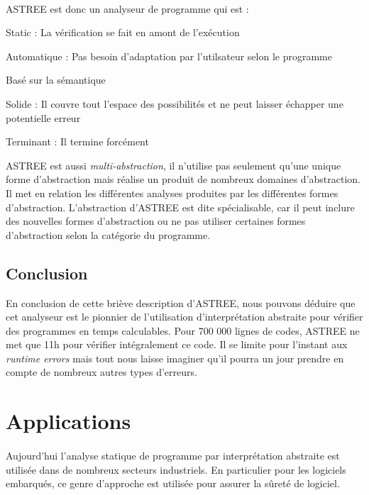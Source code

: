\documentclass[french]{report}
\begin{document}
\paragraph{}
ASTREE est donc un analyseur de programme qui est :
\begin{description}
    \item Static : La vérification se fait en amont de l'exécution
    \item Automatique : Pas besoin d'adaptation par l'utilsateur selon le programme
    \item Basé sur la sémantique
    \item Solide : Il couvre tout l'espace des possibilités et ne peut laisser échapper une potentielle erreur
    \item Terminant : Il termine forcément
\end{description}
ASTREE est aussi \textit{multi-abstraction}, il n'utilise pas seulement qu'une unique forme d'abstraction mais réalise
un produit de nombreux domaines d'abstraction. Il met en relation les différentes analyses produites par les différentes
formes d'abstraction. L'abstraction d'ASTREE est dite spécialisable, car il peut inclure des nouvelles
formes d'abstraction ou ne pas utiliser certaines formes d'abstraction selon la catégorie du programme.


\subsection{Conclusion}
En conclusion de cette briève description d'ASTREE, nous pouvons déduire que cet analyseur est le pionnier de l'utilisation
d'interprétation abstraite pour vérifier des programmes en temps calculables. Pour 700 000 lignes
de codes, ASTREE ne met que 11h pour vérifier intégralement ce code.
Il se limite pour l'instant aux \textit{runtime errors} mais tout nous laisse imaginer qu'il
pourra un jour prendre en compte de nombreux autres types d'erreurs.


\section{Applications}

\paragraph{}
Aujourd'hui l'analyse statique de programme par interprétation abstraite est utilisée dans de nombreux secteurs industriels. En particulier pour les logiciels embarqués, ce genre d'approche est utilisée pour assurer la sûreté de logiciel. \\
\end{document}
